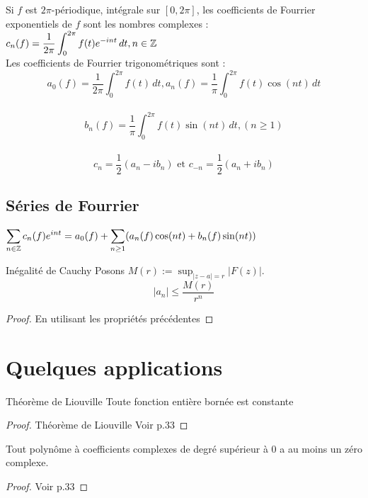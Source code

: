 \documentclass[]{report}
\begin{document}
\begin{ra}{}{}
    Si $f$ est $2\pi$-périodique, intégrale sur $[0,2\pi]$, les coefficients de Fourrier exponentiels de $f$ sont les nombres complexes : $\displaystyle{c_n(f)=\frac{1}{2\pi}\int_0^{2\pi}f(t)e^{-int}\,dt},n\in \mathbb{Z}$\\
    Les coefficients de Fourrier trigonométriques sont :\\
    $$a_0(f)=\frac{1}{2\pi}\int_0^{2\pi}f(t)\,dt,a_n(f)=\frac{1}{\pi}\int_0^{2\pi}f(t)\cos(nt)\,dt$$\\
    $$b_n(f)=\frac{1}{\pi}\int_0^{2\pi}f(t)\sin(nt)\,dt,(n\ge1)$$\\
    $$c_n=\frac12(a_n-ib_n)\text{ et }c_{-n}=\frac12(a_n+ib_n)$$
\end{ra}

\subsection*{Séries de Fourrier}

$\displaystyle{\sum_{n\in\mathbb{Z}}c_n(f)e^{int}=a_0(f)+\sum_{n\ge 1}(a_n(f)\cos(nt)+b_n(f)\sin(nt))}$

\begin{prop}{Inégalité de Cauchy}{}
Posons $\displaystyle{M(r):=\sup_{|z-a|=r}|F(z)|}$.\\
    $$|a_n|\le \frac{M(r)}{r^n}$$
\end{prop}

\begin{proof}{}{}
    En utilisant les propriétés précédentes
\end{proof}

\section{Quelques applications}

\begin{tm}{Théorème de Liouville}{}
    Toute fonction entière bornée est constante
\end{tm}

\begin{proof}{Théorème de Liouville}{}
    Voir p.33
\end{proof}

\begin{cor}{}{}
    Tout polynôme à coefficients complexes de degré supérieur à 0 a au moins un zéro complexe.
\end{cor}

\begin{proof}{}{}
    Voir p.33
\end{proof}
\end{document}
